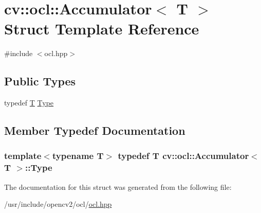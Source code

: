 \hypertarget{structcv_1_1ocl_1_1Accumulator}{\section{cv\-:\-:ocl\-:\-:Accumulator$<$ T $>$ Struct Template Reference}
\label{structcv_1_1ocl_1_1Accumulator}
}


{\ttfamily \#include $<$ocl.\-hpp$>$}

\subsection*{Public Types}
\begin{DoxyCompactItemize}
\item 
typedef \hyperlink{calib3d_8hpp_a3efb9551a871ddd0463079a808916717}{T} \hyperlink{structcv_1_1ocl_1_1Accumulator_ac0f61f94e5e2d62917d750bfee3b16ad}{Type}
\end{DoxyCompactItemize}


\subsection{Member Typedef Documentation}
\hypertarget{structcv_1_1ocl_1_1Accumulator_ac0f61f94e5e2d62917d750bfee3b16ad}{
\subsubsection[{Type}]{\setlength{\rightskip}{0pt plus 5cm}template$<$typename T$>$ typedef {\bf T} {\bf cv\-::ocl\-::\-Accumulator}$<$ {\bf T} $>$\-::{\bf Type}}}\label{structcv_1_1ocl_1_1Accumulator_ac0f61f94e5e2d62917d750bfee3b16ad}


The documentation for this struct was generated from the following file\-:\begin{DoxyCompactItemize}
\item 
/usr/include/opencv2/ocl/\hyperlink{ocl_2ocl_8hpp}{ocl.\-hpp}\end{DoxyCompactItemize}
